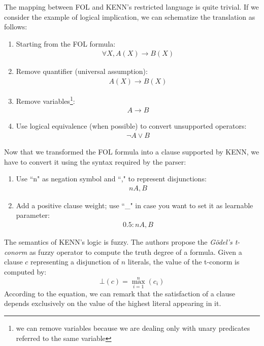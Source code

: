 The mapping between FOL and KENN's restricted language is quite trivial. If we consider the example of logical implication, we can schematize the translation as follows:
\begin{enumerate}
    \item Starting from the FOL formula:
    \begin{gather*}
        \forall X, A(X) \to B(X)
    \end{gather*}
    \item Remove quantifier (universal assumption):
    \begin{gather*}
        A(X) \to B(X)
    \end{gather*}
    \item Remove variables\footnote{we can remove variables because we are dealing only with unary predicates referred to the same variable}:
    \begin{gather*}
        A \to B
    \end{gather*}
    \item Use logical equivalence (when possible) to convert unsupported operators:
    \begin{gather*}
        \neg A \vee B
    \end{gather*}
\end{enumerate}
Now that we transformed the FOL formula into a clause supported by KENN, we have to convert it using the syntax required by the parser:
\begin{enumerate}
    \item Use ``n" as negation symbol and ``," to represent disjunctions:
    \begin{gather*}
        nA,B
    \end{gather*}
    \item Add a positive clause weight; use ``\_" in case you want to set it as learnable parameter:
    \begin{gather*}
        0.5:nA,B
    \end{gather*}
\end{enumerate}

The semantics of KENN's logic is fuzzy. The authors propose the \textit{Gödel’s t-conorm} as fuzzy operator to compute the truth degree of a formula. Given a clause $ c $ representing a disjunction of $ n $ literals, the value of the t-conorm is computed by:
\begin{equation*} \label{eq:godel}
    \bot(c) = \max\limits_{i=1}^{n}(c_{i})
\end{equation*}
According to the equation, we can remark that the satisfaction of a clause depends exclusively on the value of the highest literal appearing in it.


